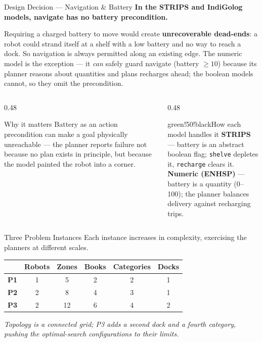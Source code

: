\documentclass{beamer}
\begin{document}
\begin{frame}{Design Decision --- Navigation \& Battery}
\small
\textbf{\large \alert{In the STRIPS and IndiGolog models, navigate has no battery precondition.}}

\vspace{0.5em}
Requiring a charged battery to move would create \textbf{unrecoverable
dead-ends}: a robot could strand itself at a shelf with a low battery and no
way to reach a dock. So navigation is always permitted along an existing edge.
The numeric model is the exception --- it \emph{can} safely guard navigate
(battery $\geq 10$) because its planner reasons about quantities and plans
recharges ahead; the boolean models cannot, so they omit the precondition.

\vspace{0.3em}
\begin{columns}
\begin{column}{0.48\textwidth}
\begin{block}{Why it matters}
Battery as an action precondition can make a goal physically unreachable ---
the planner reports failure not because no plan exists in principle, but
because the model painted the robot into a corner.
\end{block}
\end{column}
\begin{column}{0.48\textwidth}
\begin{colorblock}[white]{green!50!black}{How each model handles it}
\textbf{STRIPS} --- battery is an abstract boolean flag; \texttt{shelve}
depletes it, \texttt{recharge} clears it.\\[0.4em]
\textbf{Numeric (ENHSP)} --- battery is a quantity (0--100); the planner
balances delivery against recharging trips.
\end{colorblock}
\end{column}
\end{columns}
\end{frame}

\begin{frame}{Three Problem Instances}
Each instance increases in complexity, exercising the planners at different
scales.

\vspace{0.8em}
\begin{center}
\begin{tabular}{lccccc}
\toprule
 & \textbf{Robots} & \textbf{Zones} & \textbf{Books} & \textbf{Categories} & \textbf{Docks}\\
\midrule
\textbf{P1} & 1 & 5  & 2 & 2 & 1\\
\textbf{P2} & 2 & 8  & 4 & 3 & 1\\
\textbf{P3} & 2 & 12 & 6 & 4 & 2\\
\bottomrule
\end{tabular}
\end{center}

\vspace{0.8em}
{\small\color{gray}\itshape Topology is a connected grid; P3 adds a second
dock and a fourth category, pushing the optimal-search configurations to their
limits.}
\end{frame}
\end{document}
